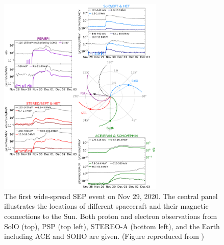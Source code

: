\begin{figure}[!htb]
    \centering
    \includegraphics[width = 0.7\textwidth, height = 0.5\textheight]{images/2020-11-29_overview_plot.png}
    \caption[The first wide-spread \acl{SEP} event on Nov 29, 2020]{The first wide-spread \acl{SEP} event on Nov 29, 2020. The central panel illustrates the locations of different spacecraft and their magnetic connections to the Sun. Both proton and electron observations from \ac{SolO} (top), \ac{PSP} (top left), \ac{STEREO}-A (bottom left), and the Earth including \ac{ACE} and \ac{SOHO} are given. (Figure reproduced from \citet{Kolhoff2021AA})}
    \label{Fig:SEP_widespread}
\end{figure}


